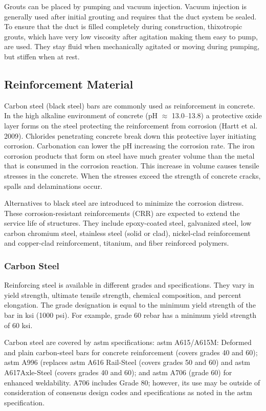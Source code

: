 Grouts can be placed by pumping and vacuum injection. Vacuum injection is generally used after initial grouting and requires that the duct system be sealed. To ensure that the duct is filled completely during construction, thixotropic grouts, which have very low viscosity after agitation making them easy to pump, are used. They stay fluid when mechanically agitated or moving during pumping, but stiffen when at rest.


\subsection{Reinforcement Material}
\label{subsec:reinforcement-material}
Carbon steel (black steel) bars are commonly used as reinforcement in concrete. In the high alkaline environment of concrete (pH $\approx$ 13.0--13.8) a protective oxide layer forms on the steel protecting the reinforcement from corrosion (Hartt et al. 2009). Chlorides penetrating concrete break down this protective layer initiating corrosion. Carbonation can lower the pH increasing the corrosion rate. The iron corrosion products that form on steel have much greater volume than the metal that is consumed in the corrosion reaction. This increase in volume causes tensile stresses in the concrete. When the stresses exceed the strength of concrete cracks, spalls and delaminations occur.

Alternatives to black steel are introduced to minimize the corrosion distress. These corrosion-resistant reinforcements (CRR) are expected to extend the service life of structures. They include epoxy-coated steel, galvanized steel, low carbon chromium steel, stainless steel (solid or clad), nickel-clad reinforcement and copper-clad reinforcement, titanium, and fiber reinforced polymers.

\subsubsection{Carbon Steel}
Reinforcing steel is available in different grades and specifications. They vary in yield strength, ultimate tensile strength, chemical composition, and percent elongation. The grade designation is equal to the minimum yield strength of the bar in ksi (1000 psi). For example, grade 60 rebar has a minimum yield strength of 60 ksi.

Carbon steel are covered by \acrshort*{astm} specifications: \acrshort*{astm} A615/A615M: Deformed and plain carbon-steel bars for concrete reinforcement (covers grades 40 and 60); \acrshort*{astm} A996 (replaces \acrshort*{astm} A616 Rail-Steel (covers grades 50 and 60) and \acrshort*{astm} A617Axle-Steel (covers grades 40 and 60); and \acrshort*{astm} A706 (grade 60) for enhanced weldability. A706 includes Grade 80; however, its use may be outside of consideration of consensus design codes and specifications as noted in the \acrshort*{astm} specification.

